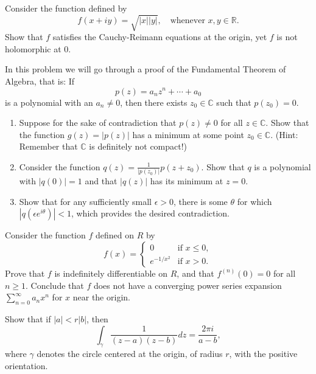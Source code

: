 \documentclass{article}
\newcommand\R{\ensuremath{\mathbb{R}}}
\newcommand\C{\ensuremath{\mathbb{C}}}
\begin{document}
\begin{problem}
Consider the function defined by \[
	f(x+iy)=\sqrt{|x||y|},\quad \text{whenever } x,y \in \R
	.\]
Show that $f$ satisfies the Cauchy-Reimann equations at the origin, yet $f$ is not holomorphic at 0.
\end{problem}
\begin{problem}
In this problem we will go through a proof of the Fundamental Theorem of Algebra,
that is: If \[
	p(z)=a_n z^n + \cdots + a_0
\] is a polynomial with an $a_n\neq 0$, then there exists $z_0\in \C$ such that $p(z_0)=0$.
\begin{enumerate}[label=(\roman*)]
	\item Suppose for the sake of contradiction that $p(z) \neq 0$ for all $z \in \C$. Show that the function $g(z) = |p(z)|$ has a minimum at some point $z_0\in \C$. (Hint: Remember that $\C$ is definitely not compact!)
	\item Consider the function $q(z)=\frac{1}{|p(z_0)|}p(z+z_0)$.
	      Show that $q$ is a polynomial with $|q(0)| = 1$ and that $|q(z)|$ has its minimum at $z = 0$.
	\item Show that for any sufficiently small $\epsilon>0$, there is some $\theta$ for which $|q(\epsilon e^{i\theta})|<1$, which provides the desired contradiction.
\end{enumerate}
\end{problem}
\begin{problem}
Consider the function $f$ defined on $R$ by \[
	f(x) = \begin{cases}
		0            & \text{if } x\le 0, \\
		e^{-1 / x^2} & \text{if } x > 0.
	\end{cases}
\]
Prove that $f$ is indefinitely differentiable on $R$, and that $f^{(n)}(0)=0$ for all $n\ge 1$.
Conclude that $f$ does not have a converging power series expansion $\sum_{n=0}^{\infty} a_n x^n$ for $x$ near the origin.
\end{problem}
\begin{problem}
Show that if $|a|<r|b|$, then  \[
	\int_{\gamma}\frac{1}{(z-a)(z-b)}dz = \frac{2\pi i}{a-b}
	,\] where $\gamma$ denotes the circle centered at the origin, of radius $r$, with the positive orientation.
\end{problem}
\end{document}
